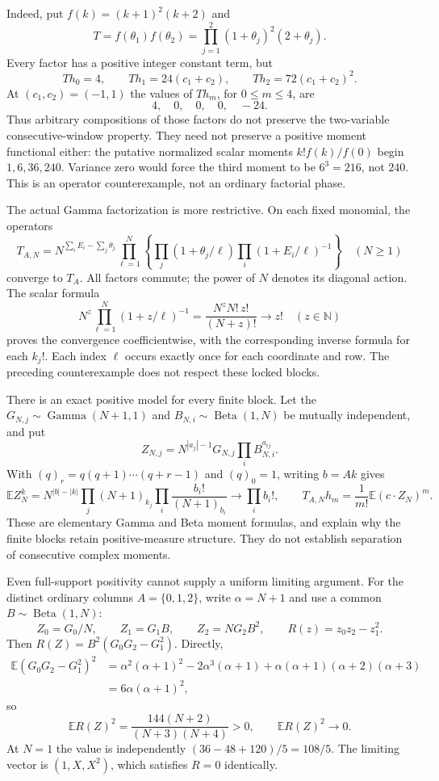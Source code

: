 \documentclass[11pt]{article}
\begin{document}
Indeed, put $f(k)=(k+1)^2(k+2)$ and
\[
 T=f(\theta_1)f(\theta_2)
   =\prod_{j=1}^2(1+\theta_j)^2(2+\theta_j).
\]
Every factor has a positive integer constant term, but
\[
 Th_0=4,\qquad Th_1=24(c_1+c_2),\qquad
 Th_2=72(c_1+c_2)^2.
\]
At $(c_1,c_2)=(-1,1)$ the values of $Th_m$, for $0\le m\le4$, are
\[
 4,\quad0,\quad0,\quad0,\quad-24.
\]
Thus arbitrary compositions of those factors do not preserve the
two-variable consecutive-window property.  They need not preserve a
positive moment functional either: the putative normalized scalar
moments $k!f(k)/f(0)$ begin $1,6,36,240$.  Variance zero would force
the third moment to be $6^3=216$, not $240$.  This is an operator
counterexample, not an ordinary factorial phase.

The actual Gamma factorization is more restrictive.  On each fixed
monomial, the operators
\[
 T_{A,N}
 =N^{\sum_iE_i-\sum_j\theta_j}
   \prod_{\ell=1}^N
   \left\{\prod_j(1+\theta_j/\ell)
                 \prod_i(1+E_i/\ell)^{-1}\right\}
 \quad(N\ge1)
\]
converge to $T_A$.  All factors commute; the power of $N$ denotes its
diagonal action.  The scalar formula
\[
 N^z\prod_{\ell=1}^N(1+z/\ell)^{-1}
   =\frac{N^zN!\,z!}{(N+z)!}\longrightarrow z!
 \quad(z\in\mathbb N)
\]
proves the convergence coefficientwise, with the corresponding
inverse formula for each $k_j!$.  Each index $\ell$ occurs exactly once
for each coordinate and row.  The preceding counterexample does not
respect these locked blocks.

There is an exact positive model for every finite block.  Let the
$G_{N,j}\sim\operatorname{Gamma}(N+1,1)$ and
$B_{N,i}\sim\operatorname{Beta}(1,N)$ be mutually independent, and put
\[
 Z_{N,j}=N^{|a_j|-1}G_{N,j}\prod_iB_{N,i}^{a_{ij}}.
\]
With $(q)_r=q(q+1)\cdots(q+r-1)$ and $(q)_0=1$, writing $b=Ak$ gives
\[
 \mathbb E Z_N^k
 =N^{|b|-|k|}
   \prod_j(N+1)_{k_j}
   \prod_i\frac{b_i!}{(N+1)_{b_i}}
 \longrightarrow\prod_i b_i!,
 \qquad
 T_{A,N}h_m=\frac1{m!}\mathbb E(c\cdot Z_N)^m.
\]
These are elementary Gamma and Beta moment formulas, and explain why
the finite blocks retain positive-measure structure.  They do not
establish separation of consecutive complex moments.

Even full-support positivity cannot supply a uniform limiting
argument.  For the distinct ordinary columns $A=\{0,1,2\}$, write
$\alpha=N+1$ and use a common $B\sim\operatorname{Beta}(1,N)$:
\[
 Z_0=G_0/N,\qquad Z_1=G_1B,\qquad Z_2=NG_2B^2,
 \qquad R(z)=z_0z_2-z_1^2.
\]
Then $R(Z)=B^2(G_0G_2-G_1^2)$.  Directly,
\[
 \begin{split}
 \mathbb E(G_0G_2-G_1^2)^2
 &=\alpha^2(\alpha+1)^2-2\alpha^3(\alpha+1)
       +\alpha(\alpha+1)(\alpha+2)(\alpha+3)\\
 &=6\alpha(\alpha+1)^2,
 \end{split}
\]
so
\[
 \mathbb E R(Z)^2
 =\frac{144(N+2)}{(N+3)(N+4)}>0,\qquad
 \mathbb E R(Z)^2\longrightarrow0.
\]
At $N=1$ the value is independently $(36-48+120)/5=108/5$.
The limiting vector is $(1,X,X^2)$, which satisfies $R=0$ identically.
\end{document}
